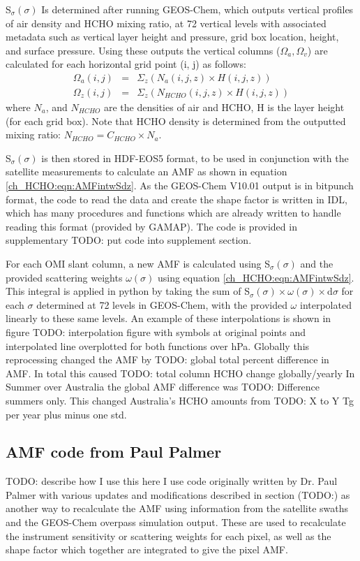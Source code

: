     S$_\sigma(\sigma)$ Is determined after running GEOS-Chem, which outputs vertical profiles of air density and HCHO mixing ratio, at 72 vertical levels with associated metadata such as vertical layer height and pressure, grid box location, height, and surface pressure.
    Using these outputs the vertical columns ($\Omega_a, \Omega_v$) are calculated for each horizontal grid point (i, j) as follows:
    \begin{align*}
      \Omega_a(i,j) &=& \Sigma_z \left( N_a(i,j,z) \times H(i,j,z) \right)
      \\
      \Omega_z(i,j) &=& \Sigma_z \left( N_{HCHO}(i,j,z) \times H(i,j,z) \right)
    \end{align*}
    where $N_a$, and $N_{HCHO}$ are the densities of air and HCHO, H is the layer height (for each grid box).
    Note that HCHO density is determined from the outputted mixing ratio: $N_{HCHO} = C_{HCHO} \times N_a$.

    S$_\sigma(\sigma)$ is then stored in HDF-EOS5 format, to be used in conjunction with the satellite measurements to calculate an AMF as shown in equation \ref{ch_HCHO:eqn:AMFintwSdz}.
    As the GEOS-Chem V10.01 output is in bitpunch format, the code to read the data and create the shape factor is written in IDL, which has many procedures and functions which are already written to handle reading this format (provided by GAMAP).
    The code is provided in supplementary TODO: put code into supplement section.
    
    For each OMI slant column, a new AMF is calculated using S$_\sigma(\sigma)$ and the provided scattering weights $\omega(\sigma)$ using equation \ref{ch_HCHO:eqn:AMFintwSdz}.
    This integral is applied in python by taking the sum of S$_\sigma(\sigma) \times \omega(\sigma) \times \mathrm{d}\sigma$ for each $\sigma$ determined at 72 levels in GEOS-Chem, with the provided $\omega$ interpolated linearly to these same levels.
    An example of these interpolations is shown in figure TODO: interpolation figure with symbols at original points and interpolated line overplotted for both functions over hPa.
    Globally this reprocessing changed the AMF by TODO: global total percent difference in AMF. 
    In total this caused TODO: total column HCHO change globally/yearly
    In Summer over Australia the global AMF difference was TODO: Difference summers only.
    This changed Australia's HCHO amounts from TODO: X to Y Tg per year plus minus one std.
    
  \subsection{AMF code from Paul Palmer}
  \label{ch_HCHO:sec:PPCode}
    TODO: describe how I use this here
    I use code originally written by Dr. Paul Palmer with various updates and modifications described in section (TODO:) as another way to recalculate the AMF using information from the satellite swaths and the GEOS-Chem overpass simulation output.
    These are used to recalculate the instrument sensitivity or scattering weights for each pixel, as well as the shape factor which together are integrated to give the pixel AMF.
   
